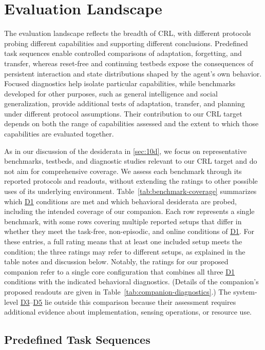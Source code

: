 \documentclass[10pt,journal,compsoc]{IEEEtran}
\DeclareRobustCommand{\Dref}[1]{\hyperref[sec:d#1]{D#1}}
\begin{document}
\section{Evaluation Landscape}
\label{sec:benchmark-coverage}


The evaluation landscape reflects the breadth of CRL, with different protocols probing different capabilities and supporting different conclusions.
Predefined task sequences enable controlled comparisons of adaptation, forgetting, and transfer, whereas reset-free and continuing testbeds expose the consequences of persistent interaction and state distributions shaped by the agent's own behavior.
Focused diagnostics help isolate particular capabilities, while benchmarks developed for other purposes, such as general intelligence and social generalization, provide additional tests of adaptation, transfer, and planning under different protocol assumptions.
Their contribution to our CRL target depends on both the range of capabilities assessed and the extent to which those capabilities are evaluated together.

As in our discussion of the desiderata in \cref{sec:10d}, we focus on representative benchmarks, testbeds, and diagnostic studies relevant to our CRL target and do not aim for comprehensive coverage.
We assess each benchmark through its reported protocols and readouts, without extending the ratings to other possible uses of its underlying environment.
Table~\ref{tab:benchmark-coverage} summarizes which \Dref{1} conditions are met and which behavioral desiderata are probed, including the intended coverage of our companion.
Each row represents a single benchmark, with some rows covering multiple reported setups that differ in whether they meet the task-free, non-episodic, and online conditions of \Dref{1}.
For these entries, a full rating means that at least one included setup meets the condition; the three ratings may refer to different setups, as explained in the table notes and discussion below.
Notably, the ratings for our proposed companion refer to a single core configuration that combines all three \Dref{1} conditions with the indicated behavioral diagnostics.
(Details of the companion's proposed readouts are given in Table~\ref{tab:companion-diagnostics}.)
The system-level \Dref{3}--\Dref{5} lie outside this comparison because their assessment requires additional evidence about implementation, sensing operations, or resource use.

\subsection{Predefined Task Sequences}
\label{sec:landscape-sequences}
\end{document}

